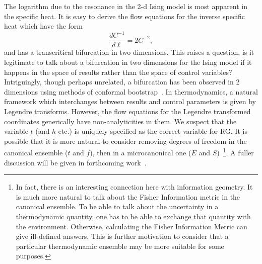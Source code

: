 \documentclass[
 reprint,
 amsmath,amssymb,
 aps, superscriptaddress, pre
]{revtex4-1}
\begin{document}
The logarithm due to the resonance in the 2-d Ising model is most apparent in the specific heat. It is easy to derive the flow equations for the inverse specific heat which have the form
\begin{equation}
 \frac{d C^{-1}}{d \ell} = 2 C^{-2} ,
\end{equation}
and has a transcritical bifurcation in two dimensions. This raises a question, is it legitimate to talk about a bifurcation in two dimensions for the Ising model if it happens in the space of results rather than the space of control variables? Intriguingly, though perhaps unrelated, a bifurcation has been observed in 2 dimensions using methods of conformal bootstrap~\cite{golden2015no, el2014conformal}. In thermodynamics, a natural framework which interchanges between results and control parameters is given by Legendre transforms. However, the flow equations for the Legendre transformed coordinates generically have non-analyticities in them. We suspect that the variable $t$ (and $h$ etc.) is uniquely specified as the correct variable for RG.  It is possible that it is more natural to consider removing degrees of freedom in the canonical ensemble ($t$ and $f$), then in a microcanonical one ($E$ and $S$)~\footnote{In fact, there is an interesting connection here with information geometry. It is much more natural to talk about the Fisher Information metric in the canonical ensemble. To be able to talk about the uncertainty in a thermodynamic quantity, one has to be able to exchange that quantity with the environment. Otherwise, calculating the Fisher Information Metric can give ill-defined answers. This is further motivation to consider that a particular thermodynamic ensemble may be more suitable for some purposes.}. A fuller discussion will be given in forthcoming work~\cite{Clement18}.


\end{document}
